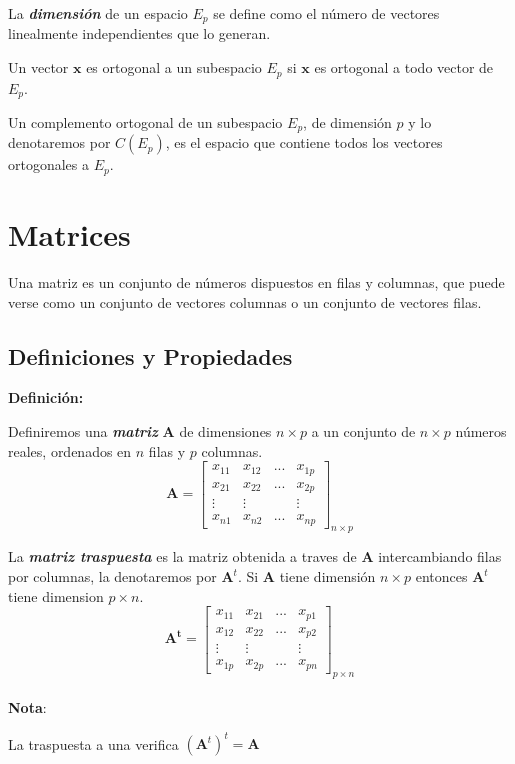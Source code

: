 \documentclass[12pt,letterpaper]{report} %
\begin{document}
La \textit{\textbf{dimensión}} de un espacio $E_p$ se define como el número de vectores linealmente independientes que lo generan.

Un vector $\mathbf{x}$ es ortogonal a un subespacio $E_p$ si $\mathbf{x}$ es ortogonal a todo vector de $E_p$.

Un complemento ortogonal de un subespacio $E_p$, de dimensión $p$ y lo denotaremos por $C(E_p)$, es el espacio que contiene todos los vectores ortogonales a $E_p$.

\section{Matrices}

Una matriz es un conjunto de números dispuestos en filas y columnas, que puede verse como un conjunto de vectores columnas o un conjunto de vectores filas.

\subsection{Definiciones y Propiedades}

\textbf{Definición:}

Definiremos una \textit{\textbf{matriz}} $\mathbf{A}$ de dimensiones $n \times p$ a un conjunto de $n \times p$ números reales, ordenados en $n$ filas y $p$ columnas.
$$
\mathbf{A}=\begin{bmatrix}
x_{11} & x_{12} & ... & x_{1p} \\
x_{21} & x_{22} & ... & x_{2p} \\
\vdots & \vdots &   & \vdots \\
x_{n1} & x_{n2} & ... & x_{np} 
\end{bmatrix}_{n\times p}
$$

La \textit{\textbf{matriz traspuesta}} es la matriz obtenida a traves de $\mathbf{A}$ intercambiando filas por columnas, la denotaremos por $\mathbf{A}^t$. Si $\mathbf{A}$ tiene dimensión $n \times p$ entonces $\mathbf{A}^t$ tiene dimension $p \times n$. 
$$
\mathbf{A^t}=\begin{bmatrix}
x_{11} & x_{21} & ... & x_{p1} \\
x_{12} & x_{22} & ... & x_{p2} \\
\vdots & \vdots &   & \vdots \\
x_{1p} & x_{2p} & ... & x_{pn} 
\end{bmatrix}_{p\times n}
$$
\\
\textbf{Nota}:

La traspuesta a una verifica $(\mathbf{A}^t)^t=\mathbf{A}$ \\
\end{document}
